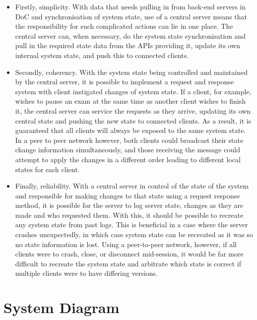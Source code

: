 \begin{itemize}

\item Firstly, simplicity.  With data that needs pulling in from back-end servers in DoC and synchronisation of system state, use of a central server means that the responsibility for such complicated actions can lie in one place.  The central server can, when necessary, do the system state synchronisation and pull in the required state data from the APIs providing it, update its own internal system state, and push this to connected clients.

\item Secondly, coherency.  With the system state being controlled and maintained by the central server, it is possible to implement a request and response system with client instigated changes of system state.  If a client, for example, wishes to pause an exam at the same time as another client wishes to finish it, the central server can service the requests as they arrive, updating its own central state and pushing the new state to connected clients.  As a result, it is guaranteed that all clients will always be exposed to the same system state.  In a peer to peer network however, both clients could broadcast their state change information simultaneously, and those receiving the message could attempt to apply the changes in a different order leading to different local states for each client.

\item Finally, reliability.  With a central server in control of the state of the system and responsible for making changes to that state using a request response method, it is possible for the server to log server state, changes as they are made and who requested them.  With this, it should be possible to recreate any system state from past logs.  This is beneficial in a case where the server crashes unexpectedly, in which case system state can be recreated as it was so no state information is lost.  Using a peer-to-peer network, however, if all clients were to crash, close, or disconnect mid-session, it would be far more difficult to recreate the system state and arbitrate which state is correct if multiple clients were to have differing versions.

\end{itemize}

\FloatBarrier

\section{System Diagram}

